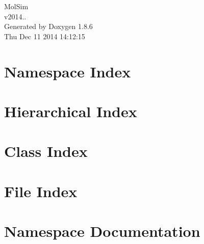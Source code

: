 \documentclass[twoside]{book}
\newcommand{\clearemptydoublepage}{%
  \newpage{\pagestyle{empty}\cleardoublepage}%
}
\begin{document}
\hypersetup{pageanchor=false}
\begin{titlepage}
\vspace*{7cm}
\begin{center}%
{\Large Mol\-Sim \\[1ex]\large v2014.. }\\
\vspace*{1cm}
{\large Generated by Doxygen 1.8.6}\\
\vspace*{0.5cm}
{\small Thu Dec 11 2014 14:12:15}\\
\end{center}
\end{titlepage}
\clearemptydoublepage
\tableofcontents
\clearemptydoublepage
{}
\hypersetup{pageanchor=true}

\chapter{Namespace Index}

\chapter{Hierarchical Index}

\chapter{Class Index}

\chapter{File Index}

\chapter{Namespace Documentation}





\end{document}
